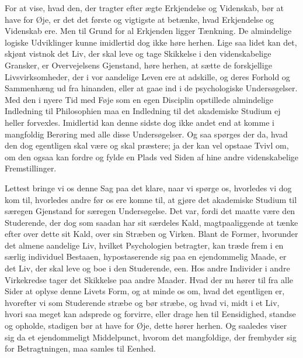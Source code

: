 \documentclass[12pt,a4paper]{book}
\newcommand{\opage}[1]{\marginnote{\footnotesize\textit{[#1]}}}
\begin{document}
For at vise, hvad den, der tragter efter ægte Erkjendelse og Videnskab, bør
at have for Øje, er det det første og vigtigste at betænke, hvad Erkjendelse
og Videnskab ere. Men til Grund for al Erkjenden ligger Tænkning. De
almindelige logiske Udviklinger kunne imidlertid dog ikke høre herhen. Lige
saa lidet kan det, skjønt vistnok det Liv, der skal leve og tage Skikkelse i
den videnskabelige Gransker, er Overvejelsens Gjenstand, høre herhen, at
sætte de forskjellige Livsvirksomheder, der i vor aandelige Leven ere at
adskille, og deres Forhold og Sammenhæng ud fra hinanden, eller at gaae ind i
de psychologiske Undersøgelser. Med den i nyere Tid med Føje som en egen
Disciplin opstillede almindelige Indledning til Philosophien maa en
Indledning til det akademiske Studium ej heller forvexles. Imidlertid kan
denne sidste dog ikke andet end at komme i mangfoldig Berøring med alle disse
Undersøgelser. \opage{VI} Og saa spørges der da, hvad den dog egentligen skal være og
skal præstere; ja der kan vel opstaae Tvivl om, om den ogsaa kan fordre og
fylde en Plads ved Siden af hine andre videnskabelige Fremstillinger.

Lettest bringe vi os denne Sag paa det klare, naar vi spørge os, hvorledes vi
dog kom til, hvorledes andre før os ere komne til, at gjøre det akademiske
Studium til særegen Gjenstand for særegen Undersøgelse. Det var, fordi det
maatte være den Studerende, der dog som saadan har sit særdeles Kald,
magtpaaliggende at tænke efter over dette sit Kald, over sin Stræben og
Virken. Blant de Former, hvorunder det almene aandelige Liv, hvilket
Psychologien betragter, kan træde frem i en særlig individuel Bestaaen,
hypostaserende sig paa en ejendommelig Maade, er det Liv, der skal leve og
boe i den Studerende, een. Hos andre Individer i andre Virkekredse tager det
Skikkelse paa andre Maader. Hvad der nu hører til fra alle Sider at oplyse
denne Livets Form, og at minde os om, hvad det egentligen er, hvorefter vi
som Studerende stræbe \opage{VII} og bør stræbe, og hvad vi, midt i et Liv, hvori saa
meget kan adsprede og forvirre, eller drage hen til Eensidighed, standse og
opholde, stadigen bør at have for Øje, dette hører herhen. Og saaledes viser
sig da et ejendommeligt Middelpunct, hvorom det mangfoldige, der frembyder
sig for Betragtningen, maa samles til Eenhed.
\end{document}
